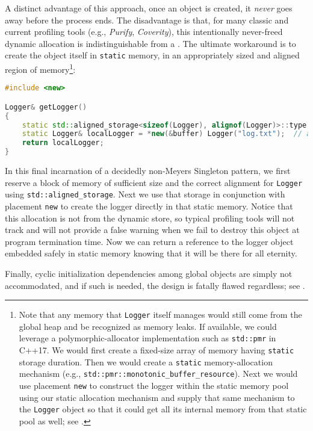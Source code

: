\noindent A distinct advantage of this approach, once an object is created, it
\emph{never} goes away before the process ends. The disadvantage is
that, for many classic and current profiling tools (e.g., \emph{Purify},
\emph{Coverity}), this intentionally never-freed dynamic allocation is
indistinguishable from a . The ultimate workaround
is to create the object itself in \lstinline!static! memory, in an
appropriately sized and aligned region of memory{\cprotect\footnote{Note
that any memory that \lstinline!Logger! itself manages would still come
from the global heap and be recognized as memory leaks. If available,
we could leverage a polymorphic-allocator implementation such as
\lstinline!std::pmr! in C++17. We would first create a fixed-size array
of memory having \lstinline!static! storage duration. Then we would
create a \lstinline!static! memory-allocation mechanism (e.g.,
\lstinline!std::pmr::monotonic_buffer_resource!). Next we would use
placement \lstinline!new! to construct the logger within the static
memory pool using our static allocation mechanism and supply that same
mechanism to the \lstinline!Logger! object so that it could get all its
  internal memory from that static pool as well; see \cite{lakos22}.}}:

\begin{lstlisting}[language=C++]
#include <new>

Logger& getLogger()
{
    static std::aligned_storage<sizeof(Logger), alignof(Logger)>::type buffer;
    static Logger& localLogger = *new(&buffer) Logger("log.txt");  // allocate in place
    return localLogger;
}
\end{lstlisting}
    
\noindent In this final incarnation of a decidedly non-Meyers Singleton pattern,
we first reserve a block of memory of sufficient size and the correct
alignment for \lstinline!Logger! using \lstinline!std::aligned_storage!. Next
we use that storage in conjunction with placement \lstinline!new! to create
the logger directly in that static memory. Notice that this allocation
is not from the dynamic store, so typical profiling tools will not track
and will not provide a false warning when we fail to destroy this object
at program termination time. Now we can return a reference to the logger
object embedded safely in static memory knowing that it will be there
for all eternity.

Finally, cyclic initialization dependencies among global objects are
simply not accommodated, and if such is needed, the design is fatally
flawed regardless; see .

